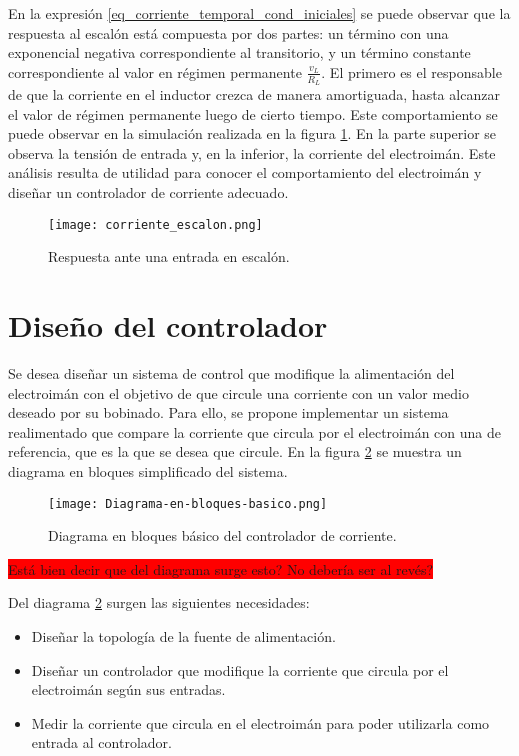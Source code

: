 En la expresión \ref{eq_corriente_temporal_cond_iniciales} se puede observar que la respuesta al escalón está compuesta por dos partes: un término con una exponencial negativa correspondiente al transitorio, y un término constante correspondiente al valor en régimen permanente $\frac{v_L}{R_L}$. El primero es el responsable de que la corriente en el inductor crezca de manera amortiguada, hasta alcanzar el valor de régimen permanente luego de cierto tiempo. Este comportamiento se puede observar en la simulación realizada en la figura \ref{fig:img_respuesta_escalon}. En la parte superior se observa la tensión de entrada y, en la inferior, la corriente del electroimán. Este análisis resulta de utilidad para conocer el comportamiento del electroimán y diseñar un controlador de corriente adecuado.


\begin{figure}[H]
	\centering
	\texttt{[image: corriente\_escalon.png]}
	\caption{Respuesta ante una entrada en escalón.}
	\label{fig:img_respuesta_escalon}
\end{figure}


\section{Diseño del controlador}


Se desea diseñar un sistema de control que modifique la alimentación del electroimán con el objetivo de que circule una corriente con un valor medio deseado por su bobinado.  Para ello, se propone implementar un sistema realimentado que compare la corriente que circula por el electroimán con una de referencia, que es la que se desea que circule. En la figura \ref{fig:img_diagrama_bloques_basico} se muestra un diagrama en bloques simplificado del sistema.

\begin{figure}[H]
	\centering
	\texttt{[image: Diagrama-en-bloques-basico.png]}
	\caption{Diagrama en bloques básico del controlador de corriente.}
	\label{fig:img_diagrama_bloques_basico}
\end{figure}

\colorbox{red}{Está bien decir que del diagrama surge esto? No debería ser al revés?}

Del diagrama \ref{fig:img_diagrama_bloques_basico} surgen las siguientes necesidades:
\begin{itemize}
	\item Diseñar la topología de la fuente de alimentación.
	\item Diseñar un controlador que modifique la corriente que circula por el electroimán según sus entradas.	
	\item Medir la corriente que circula en el electroimán para poder utilizarla como entrada al controlador.
\end{itemize}

